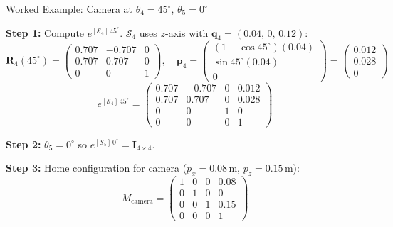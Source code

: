 \documentclass[12pt,a4paper]{article}
\newcommand{\vect}[1]{\bm{#1}}
\newcommand{\mat}[1]{\mathbf{#1}}
\begin{document}
\begin{mathbox}{Worked Example: Camera at $\theta_4 = 45^\circ$, $\theta_5 = 0^\circ$}

\textbf{Step 1:} Compute $e^{[\mathcal{S}_4]\,45^\circ}$.
$\mathcal{S}_4$ uses $z$-axis with $\vect{q}_4=(0.04,\,0,\,0.12)$:
\[
  \mat{R}_4(45^\circ) =
  \begin{pmatrix}0.707&-0.707&0\\0.707&0.707&0\\0&0&1\end{pmatrix},
  \quad
  \vect{p}_4 =
  \begin{pmatrix}(1-\cos45^\circ)(0.04)\\\sin45^\circ(0.04)\\0\end{pmatrix}
  =\begin{pmatrix}0.012\\0.028\\0\end{pmatrix}
\]
\[
  e^{[\mathcal{S}_4]\,45^\circ}
  = \begin{pmatrix}0.707&-0.707&0&0.012\\0.707&0.707&0&0.028\\0&0&1&0\\0&0&0&1\end{pmatrix}
\]

\textbf{Step 2:} $\theta_5=0^\circ$ so $e^{[\mathcal{S}_5]\,0^\circ}=\mathbf{I}_{4\times4}$.

\textbf{Step 3:} Home configuration for camera
($p_x=0.08$\,m, $p_z=0.15$\,m):
\[
  M_{\text{camera}}
  = \begin{pmatrix}1&0&0&0.08\\0&1&0&0\\0&0&1&0.15\\0&0&0&1\end{pmatrix}
\]


\end{mathbox}
\end{document}
